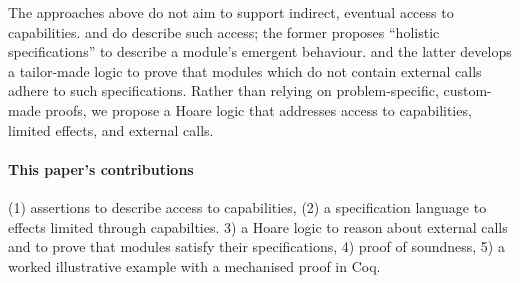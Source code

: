  The approaches above %
 do not aim to support indirect, eventual access to capabilities.
\citet{FASE} and \citet{OOPSLA22} do describe such access; %
  the former proposes  ``holistic specifications'' to describe a module's emergent behaviour. 
and the latter develops 
a tailor-made logic to prove that modules which do not contain external calls adhere to such specifications.
%
%
Rather than relying on problem-specific, custom-made proofs, we propose a Hoare logic that addresses access to capabilities, limited effects, and external calls.

  
\paragraph{This paper's contributions} %
{(1) assertions to describe   access to capabilities}, 
(2) a specification language to effects limited through capabilties.
3) a Hoare logic to reason about external calls and to prove that modules satisfy their %
specifications,
4)  proof of soundness,
5) a worked illustrative example {with a mechanised proof in Coq}.
 

